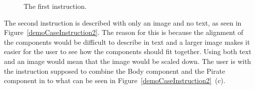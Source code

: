 	\begin{figure}[H]%
		\centering
		\qquad
		\qquad
		\caption{The first instruction.}
		\label{demoCaseInstruction1}
	\end{figure}

The second instruction is described with only an image and no text, as seen in Figure~\ref{demoCaseInstruction2}. The reason for this is because the alignment of the components would be difficult to describe in text and a larger image makes it easier for the user to see how the components should fit together. Using both text and an image would mean that the image would be scaled down. The user is with the instruction supposed to combine the Body component and the Pirate component in to what can be seen in Figure~\ref{demoCaseInstruction2}~(c).


